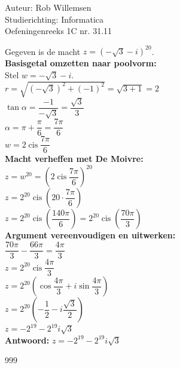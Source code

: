 \documentclass[a4paper]{article}
\begin{document}
\noindent \large Auteur: Rob Willemsen \\
\noindent \large Studierichting: Informatica\\
\noindent \large Oefeningenreeks 1C nr. 31.11\\

\medskip
\normalsize

Gegeven is de macht $z = (-\sqrt{3} - i)^{20}$. \\

\textbf{Basisgetal omzetten naar poolvorm:} \\

Stel $w = -\sqrt{3} - i$. \\

$r = \sqrt{(-\sqrt{3})^2 + (-1)^2} = \sqrt{3 + 1} = 2$ \\

$\tan \alpha = \dfrac{-1}{-\sqrt{3}} = \dfrac{\sqrt{3}}{3}$ \\

$\alpha = \pi + \dfrac{\pi}{6} = \dfrac{7\pi}{6}$ \\

$w = 2 \operatorname{cis} \dfrac{7\pi}{6}$ \\
 
\textbf{Macht verheffen met De Moivre:} \\

$z = w^{20} = \left(2 \operatorname{cis} \dfrac{7\pi}{6}\right)^{20}$ \\

$z = 2^{20} \operatorname{cis} \left(20 \cdot \dfrac{7\pi}{6}\right)$ \\

$z = 2^{20} \operatorname{cis} \left(\dfrac{140\pi}{6}\right) = 2^{20} \operatorname{cis} \left(\dfrac{70\pi}{3}\right)$ \\

\textbf{Argument vereenvoudigen en uitwerken:} \\

$\dfrac{70\pi}{3} - \dfrac{66\pi}{3} = \dfrac{4\pi}{3}$ \\

$z = 2^{20} \operatorname{cis} \dfrac{4\pi}{3}$ \\

$z = 2^{20} \left(\cos \dfrac{4\pi}{3} + i \sin \dfrac{4\pi}{3}\right)$ \\

$z = 2^{20} \left(-\dfrac{1}{2} - i\dfrac{\sqrt{3}}{2}\right)$ \\

$z = -2^{19} - 2^{19}i\sqrt{3}$ \\

\textbf{Antwoord:} $z = -2^{19} - 2^{19}i\sqrt{3}$ \\

\begin{thebibliography}{999}
\end{thebibliography}
\end{document}
